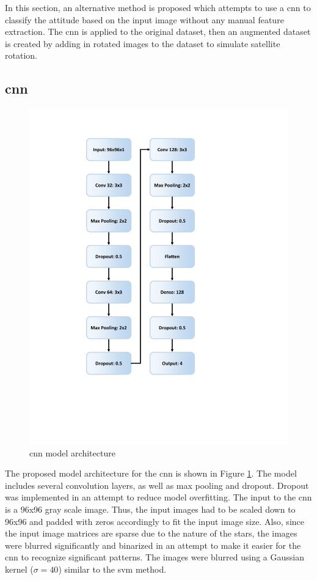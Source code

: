 \documentclass[10pt,twocolumn,letterpaper]{article}
\begin{document}
In this section, an alternative method is proposed which attempts to use a \acrfull{cnn} to classify the attitude based on the input image without any manual feature extraction. The \acrshort{cnn} is applied to the original dataset, then an augmented dataset is created by adding in rotated images to the dataset to simulate satellite rotation.

\label{sec:alt_method}

\subsection{\acrshort{cnn}}

\begin{figure}[H]
  \centering
   \includegraphics[width=0.9\linewidth, trim={13em, 16em, 22em, 7em}, clip]{cnn}
   \caption{\acrshort{cnn} model architecture}
   \label{fig:cnn}
\end{figure}

The proposed model architecture for the \acrshort{cnn} is shown in Figure \ref{fig:cnn}. The model includes several convolution layers, as well as max pooling and dropout. Dropout was implemented in an attempt to reduce model overfitting. The input to the \acrshort{cnn} is a 96x96 gray scale image. Thus, the input images had to be scaled down to 96x96 and padded with zeros accordingly to fit the input image size. Also, since the input image matrices are sparse due to the nature of the stars, the images were blurred significantly and binarized in an attempt to make it easier for the \acrshort{cnn} to recognize significant patterns. The images were blurred using a Gaussian kernel ($\sigma = 40$) similar to the \acrshort{svm} method.
\end{document}
